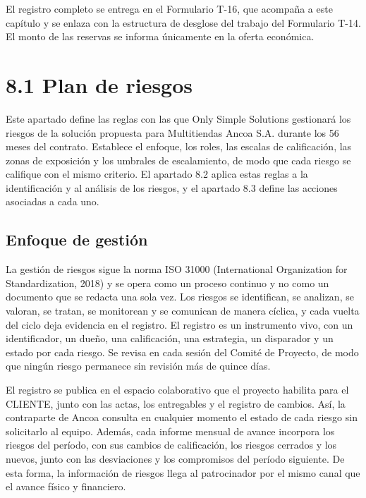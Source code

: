 \documentclass[11pt]{article}
\begin{document}
El registro completo se entrega en el Formulario T-16, que acompaña a este capítulo y se enlaza con la estructura de desglose del trabajo del Formulario T-14. El monto de las reservas se informa únicamente en la oferta económica.

\section{8.1 Plan de riesgos}\label{plan-de-riesgos}

Este apartado define las reglas con las que Only Simple Solutions gestionará los riesgos de la solución propuesta para Multitiendas Ancoa S.A. durante los 56 meses del contrato. Establece el enfoque, los roles, las escalas de calificación, las zonas de exposición y los umbrales de escalamiento, de modo que cada riesgo se califique con el mismo criterio. El apartado 8.2 aplica estas reglas a la identificación y al análisis de los riesgos, y el apartado 8.3 define las acciones asociadas a cada uno.

\setlength{\tabcolsep}{3pt}

\subsection{Enfoque de gestión}

La gestión de riesgos sigue la norma ISO 31000 (International Organization for Standardization, 2018) y se opera como un proceso continuo y no como un documento que se redacta una sola vez. Los riesgos se identifican, se analizan, se valoran, se tratan, se monitorean y se comunican de manera cíclica, y cada vuelta del ciclo deja evidencia en el registro. El registro es un instrumento vivo, con un identificador, un dueño, una calificación, una estrategia, un disparador y un estado por cada riesgo. Se revisa en cada sesión del Comité de Proyecto, de modo que ningún riesgo permanece sin revisión más de quince días.

El registro se publica en el espacio colaborativo que el proyecto habilita para el CLIENTE, junto con las actas, los entregables y el registro de cambios. Así, la contraparte de Ancoa consulta en cualquier momento el estado de cada riesgo sin solicitarlo al equipo. Además, cada informe mensual de avance incorpora los riesgos del período, con sus cambios de calificación, los riesgos cerrados y los nuevos, junto con las desviaciones y los compromisos del período siguiente. De esta forma, la información de riesgos llega al patrocinador por el mismo canal que el avance físico y financiero.
\end{document}
